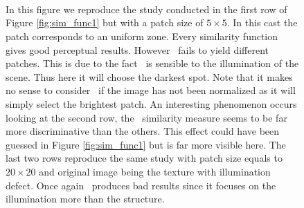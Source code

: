 \begin{figure}[H]
  \centering
   \hfill
   \hfill
   \hfill
   \hfill
   \hfill \\
   \hfill
   \hfill
   \hfill
   \hfill
   \hfill \\
     \hfill
   \hfill
   \hfill
   \hfill
   \hfill \\
   \hfill
   \hfill
   \hfill
   \hfill
   \hfill
  \caption{In this figure we reproduce the study conducted in the first row of Figure \ref{fig:sim_func1} but with a patch size of $5 \times 5$. In this cast the patch corresponds to an uniform zone. Every similarity function gives good perceptual results. However \sps \ fails to yield different patches. This is due to the fact \sps \ is sensible to the illumination of the scene. Thus here it will choose the darkest spot. Note that it makes no sense to consider \sps \ if the image has not been normalized as it will simply select the brightest patch. An interesting phenomenon occurs looking at the second row, the \scos \ similarity measure seems to be far more discriminative than the others. This effect could have been guessed in Figure \ref{fig:sim_func1} but is far more visible here. The last two rows reproduce the same study with patch size equals to $20 \times 20$ and original image being the texture with illumination defect. Once again \sps \ produces bad results since it focuses on the illumination more than the structure.}
  \label{fig:sim_func2}
\end{figure}
